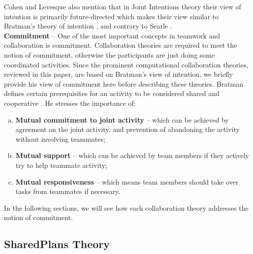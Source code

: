 \documentclass[12pt]{report}
\begin{document}

Cohen and Levesque also mention that in Joint Intentions theory their view of
intention is primarily future-directed \cite{cohen:intention-commitment} which
makes their view similar to Bratman's theory of intention
\cite{bratman:intention}, and contrary to Searle \cite{searle:collective}.\\

\textbf{Commitment} -- One of the most important concepts in teamwork and
collaboration is commitment. Collaboration theories are required to meet the
notion of commitment, otherwise the participants are just doing some coordinated
activities. Since the prominent computational collaboration theories, reviewed
in this paper, are based on Bratman's view of intention, we briefly provide his
view of commitment here before describing these theories. Bratman defines
certain prerequisites for an activity to be considered shared and cooperative
\cite{bratman:shared-activity}. He stresses the importance of:

\begin{enumerate}[a)]
  \item \textbf{Mutual commitment to joint activity} -- which can be achieved by
  agreement on the joint activity, and prevention of abandoning the activity
  without involving teammates;
  \item \textbf{Mutual support} -- which can be achieved by team members
  if they actively try to help teammate activity;
  \item \textbf{Mutual responsiveness} -- which means team members should take
  over tasks from teammates if necessary.
\end{enumerate}

In the following sections, we will see how each collaboration theory addresses
the notion of commitment.

\subsection{SharedPlans Theory}
\label{sec:sharedplans}
\end{document}
